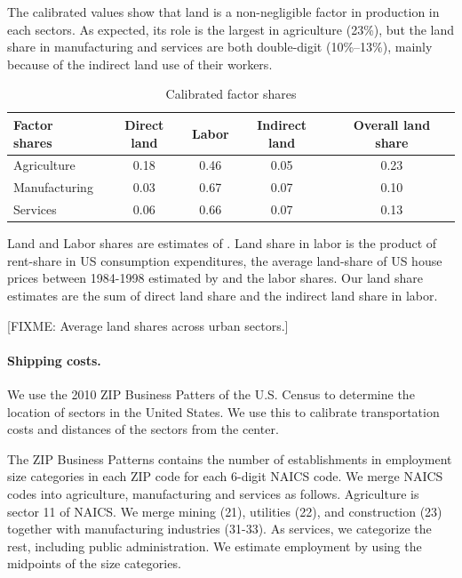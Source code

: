 \documentclass[12pt]{article}
\begin{document}
The calibrated values show that land is a non-negligible factor in production in each sectors. As expected, its role is the largest in agriculture (23\%), but the land share in manufacturing and services are both double-digit (10\%--13\%), mainly because of the indirect land use of their workers.


\begin{table}[h!]
\caption{Calibrated factor shares\label{tab:Sector_Shares}}
\begin{center}
\begin{tabular}{l|ccc|c}
\toprule
Factor shares & Direct land & Labor & Indirect land & Overall land share \\
\midrule
Agriculture & 0.18 & 0.46  & 0.05 & 0.23 \\
Manufacturing& 0.03 & 0.67 & 0.07 & 0.10  \\
Services    &  0.06 & 0.66 & 0.07 & 0.13 \\
\bottomrule
\end{tabular}
\end{center}

\noindent \footnotesize{Land and Labor shares are estimates of . Land share in labor is the product of rent-share in US consumption expenditures, the average land-share of US house prices between 1984-1998 estimated by  and the labor shares. Our land share estimates are the sum of direct land share and the indirect land share in labor.}
\end{table}

[FIXME: Average land shares across urban sectors.]

\paragraph{Shipping costs.}
We use the 2010 ZIP Business Patters of the U.S. Census \cite{CBP} to determine the location of sectors in the United States. We use this to calibrate transportation costs and distances of the sectors from the center.

The ZIP Business Patterns contains the number of establishments in employment size categories in each ZIP code for each 6-digit NAICS code. We merge NAICS codes into agriculture, manufacturing and services as follows. Agriculture is sector 11 of NAICS. We merge mining (21), utilities (22), and construction (23) together with manufacturing industries (31-33). As services, we categorize the rest, including public administration. We estimate employment by using the midpoints of the size categories.
\end{document}
